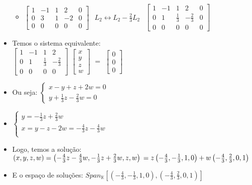 \documentclass[12pt]{article}
\begin{document}
\begin{itemize}
\begin{itemize}
		\item $\begin{bmatrix}
		1 & -1 & 1 & 2 & 0 \\ 0 & 3 & 1 & -2 & 0 \\ 0 & 0 & 0 & 0 & 0
		\end{bmatrix}$
		$\begin{matrix} L_2 \leftrightarrow L_2 - \frac{2}{3}L_2 \end{matrix}$
		$\begin{bmatrix}
		1 & -1 & 1 & 2 & 0 \\ 0 & 1 & \frac{1}{3} & -\frac{2}{3} & 0 \\ 0 & 0 & 0 & 0 & 0
		\end{bmatrix}$
		\end{itemize}
	
	\item Temos o sistema equivalente:\\
	$\begin{bmatrix}
	1 & -1 & 1 & 2 \\ 0 & 1 & \frac{1}{3} & -\frac{2}{3} \\ 0 & 0 & 0 & 0
	\end{bmatrix}$	
	$\begin{bmatrix}
	x \\ y \\ z \\ w
	\end{bmatrix}$	
	$=$
	$\begin{bmatrix}
	0 \\ 0 \\ 0
	\end{bmatrix}$	
	
	\item Ou seja:
	$	\begin{cases}
	x - y + z + 2w = 0 \\
	y + \frac{1}{3}z - \frac{2}{3}w = 0
	\end{cases}$	
	
	\item
	$ \begin{cases}
	y = - \frac{1}{3}z + \frac{2}{3}w \\
	x = y - z - 2w = -\frac{4}{3}z - \frac{4}{3}w \\
	\end{cases}$
	
	\item Logo, temos a solução:
	$(x,y,z,w) = \left( -\frac{4}{3}z - \frac{4}{3}w, - \frac{1}{3}z + \frac{2}{3}w, z, w \right) \\ =
	z \left( -\frac{4}{3}, -\frac{1}{3}, 1, 0 \right) + w \left( -\frac{4}{3}, \frac{2}{3}, 0, 1 \right)
	$
	
	\item E o espaço de soluções: $Span_{\mathbb{K}} \left[ \left( -\frac{4}{3}, -\frac{1}{3}, 1, 0 \right),
	\left( -\frac{4}{3}, \frac{2}{3}, 0, 1 \right) \right] $
	
	\end{itemize}
\newpage
\end{document}
